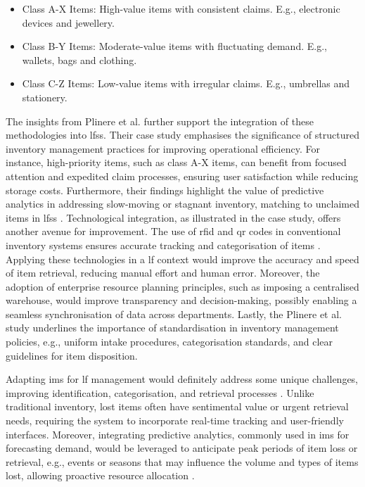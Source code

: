 \begin{itemize}
    \item Class A-X Items: High-value items with consistent claims. E.g., electronic devices and jewellery.
    \item Class B-Y Items: Moderate-value items with fluctuating demand. E.g., wallets, bags and clothing.
    \item Class C-Z Items: Low-value items with irregular claims. E.g., umbrellas and stationery.
\end{itemize}

The insights from Plinere et al. \cite{Plinere2016} further support the integration of these methodologies into \ac{lfs}s. Their case study emphasises the significance of structured inventory management practices for improving operational efficiency. For instance, high-priority items, such as class A-X items, can benefit from focused attention and expedited claim processes, ensuring user satisfaction while reducing storage costs. Furthermore, their findings highlight the value of predictive analytics in addressing slow-moving or stagnant inventory, matching to unclaimed items in \ac{lfs}s \cite{Plinere2016}. Technological integration, as illustrated in the case study, offers another avenue for improvement. The use of \ac{rfid} and \ac{qr} codes in conventional inventory systems ensures accurate tracking and categorisation of items \cite{Plinere2016, Sohail2018}. Applying these technologies in a \ac{lf} context would improve the accuracy and speed of item retrieval, reducing manual effort and human error. Moreover, the adoption of enterprise resource planning principles, such as imposing a centralised warehouse, would improve transparency and decision-making, possibly enabling a seamless synchronisation of data across departments. Lastly, the Plinere et al. \cite{Plinere2016} study underlines the importance of standardisation in inventory management policies, e.g., uniform intake procedures, categorisation standards, and clear guidelines for item disposition.

Adapting \ac{ims} for \ac{lf} management would definitely address some unique challenges, improving identification, categorisation, and retrieval processes \cite{Pauliina2024}. Unlike traditional inventory, lost items often have sentimental value or urgent retrieval needs, requiring the system to incorporate real-time tracking and user-friendly interfaces. Moreover, integrating predictive analytics, commonly used in \ac{ims} for forecasting demand, would be leveraged to anticipate peak periods of item loss or retrieval, e.g., events or seasons that may influence the volume and types of items lost, allowing proactive resource allocation \cite{Prabakaran2023}.



